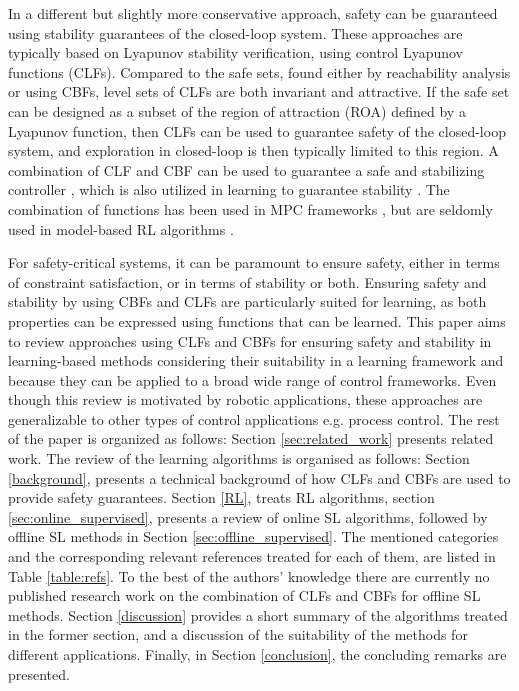 \documentclass[3p,times,procedia]{elsarticle}
\begin{document}
In a different but slightly more conservative approach, safety can be guaranteed using stability guarantees of the closed-loop system. These approaches are typically based on Lyapunov stability verification, using control Lyapunov functions (CLFs)\cite{Khalil2002NonlinearSystems}. Compared to the safe sets, found either by reachability analysis or using CBFs, level sets of CLFs are both invariant and attractive. If the safe set can be designed as a subset of the region of attraction (ROA) defined by a Lyapunov function, then CLFs can be used to guarantee safety of the closed-loop system, and exploration in closed-loop is then typically limited to this region. A combination of CLF and CBF can be used to guarantee a safe and stabilizing controller \cite{Romdlony2016a}, which is also utilized in learning to guarantee stability \cite{Jin2020}. The combination of functions has been used in MPC frameworks \cite{Wu2020}, but are seldomly used in model-based RL algorithms \cite{Choi2020}.


For safety-critical systems, it can be paramount to ensure safety, either in terms of constraint satisfaction, or in terms of stability or both. Ensuring safety and stability by using CBFs and CLFs are particularly suited for learning, as both properties can be expressed using functions that can be learned. This paper aims to review approaches using CLFs and CBFs for ensuring safety and stability in learning-based methods considering their suitability in a learning framework and because they can be applied to a broad wide range of control frameworks. Even though this review is motivated by robotic applications, these approaches are generalizable to other types of control applications e.g. process control. The rest of the paper is organized as follows: Section \ref{sec:related_work} presents related work. The review of the learning algorithms is organised as follows: Section \ref{background}, presents a technical background of how CLFs and CBFs are used to provide safety guarantees. Section \ref{RL}, treats RL algorithms, section \ref{sec:online_supervised}, presents a review of online SL algorithms, followed by offline SL methods in Section \ref{sec:offline_supervised}. The mentioned categories and the corresponding relevant references treated for each of them, are listed in Table \ref{table:refs}. To the best of the authors' knowledge there are currently no published research work on the combination of CLFs and CBFs for offline SL methods. Section \ref{discussion} provides a short summary of the algorithms treated in the former section, and a discussion of the suitability of the methods for different applications. Finally, in Section \ref{conclusion}, the concluding remarks are presented. 
\end{document}
